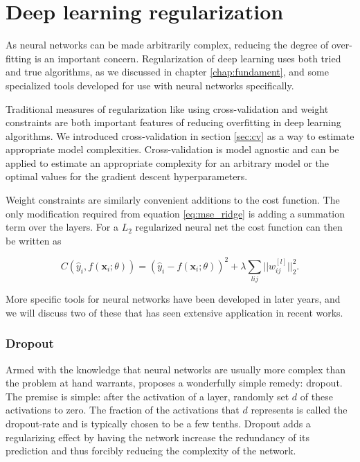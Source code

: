 \section{Deep learning regularization}

As neural networks can be made arbitrarily complex, reducing the degree of over-fitting is an important concern. Regularization of deep learning uses both tried and true algorithms, as we discussed in chapter \ref{chap:fundament}, and some specialized tools developed for use with neural networks specifically. 

Traditional measures of regularization like using cross-validation and weight constraints are both important features of reducing overfitting in deep learning algorithms. We introduced cross-validation in section \ref{sec:cv} as a way to estimate appropriate model complexities. Cross-validation is model agnostic and can be applied to estimate an appropriate complexity for an arbitrary model or the optimal values for the gradient descent hyperparameters. 

Weight constraints are similarly convenient additions to the cost function. The only modification required from equation \ref{eq:mse_ridge} is adding a summation term over the layers. For a $L_2$ regularized neural net the cost function can then be written as 

\begin{equation}
C(\hat{y}_i, f(\mathbf{x}_i; \theta)) = (\hat{y}_i - f(\mathbf{x}_i; \theta))^2 + \lambda\sum_{lij}||w_{ij}^{[l]}||^2_2.
\end{equation}

\noindent More specific tools for neural networks have been developed in later years, and we will discuss two of these that has seen extensive application in recent works. 

\subsubsection{Dropout}\label{sec:dropout}

Armed with the knowledge that neural networks are usually more complex than the problem at hand warrants, \citet{Srivastava2014} proposes a wonderfully simple remedy: dropout. The premise is simple: after the activation of a layer, randomly set $d$ of these activations to zero. The fraction of the activations that $d$ represents is called the dropout-rate and is typically chosen to be a few tenths. Dropout adds a regularizing effect by having the network increase the redundancy of its prediction and thus forcibly reducing the complexity of the network. 

